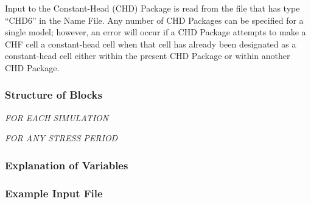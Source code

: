 
Input to the Constant-Head (CHD) Package is read from the file that has type ``CHD6'' in the Name File.  Any number of CHD Packages can be specified for a single model; however, an error will occur if a CHD Package attempts to make a CHF cell a constant-head cell when that cell has already been designated as a constant-head cell either within the present CHD Package or within another CHD Package.

\vspace{5mm}
\subsubsection{Structure of Blocks}
\vspace{5mm}

\noindent \textit{FOR EACH SIMULATION}


\vspace{5mm}
\noindent \textit{FOR ANY STRESS PERIOD}

\packageperioddescription

\vspace{5mm}
\subsubsection{Explanation of Variables}
\begin{description}

\end{description}

\vspace{5mm}
\subsubsection{Example Input File}




